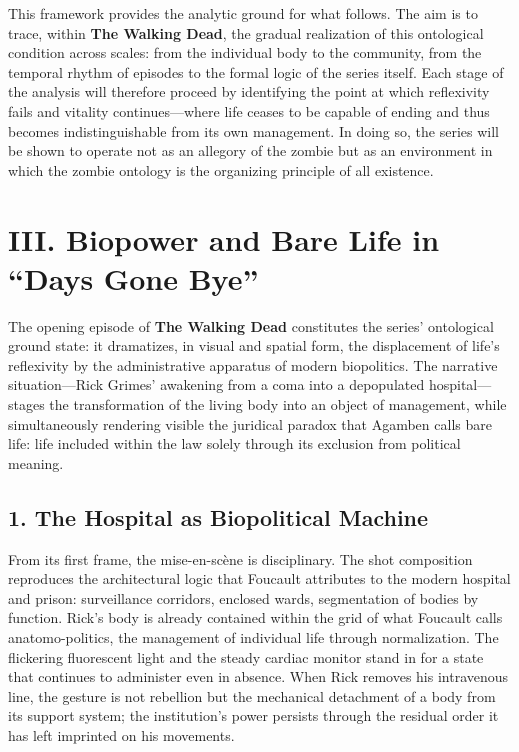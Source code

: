 \documentclass[11pt]{article}
\begin{document}
This framework provides the analytic ground for what follows.  The aim is to trace, within \textbf{The Walking Dead}, the gradual realization of this ontological condition across scales: from the individual body to the community, from the temporal rhythm of episodes to the formal logic of the series itself.  Each stage of the analysis will therefore proceed by identifying the point at which reflexivity fails and vitality continues—where life ceases to be capable of ending and thus becomes indistinguishable from its own management.  In doing so, the series will be shown to operate not as an allegory of the zombie but as an environment in which the zombie ontology is the organizing principle of all existence.
\section*{III. Biopower and Bare Life in “Days Gone Bye”}
\label{sec:org641e5a5}

The opening episode of \textbf{The Walking Dead} constitutes the series’ ontological ground state: it dramatizes, in visual and spatial form, the displacement of life’s reflexivity by the administrative apparatus of modern biopolitics.  The narrative situation—Rick Grimes’ awakening from a coma into a depopulated hospital—stages the transformation of the living body into an object of management, while simultaneously rendering visible the juridical paradox that Agamben calls bare life: life included within the law solely through its exclusion from political meaning.  
\subsection*{1. The Hospital as Biopolitical Machine}
\label{sec:orga8f5c43}

From its first frame, the mise-en-scène is disciplinary.  The shot composition reproduces the architectural logic that Foucault attributes to the modern hospital and prison: surveillance corridors, enclosed wards, segmentation of bodies by function.  Rick’s body is already contained within the grid of what Foucault calls anatomo-politics, the management of individual life through normalization.  The flickering fluorescent light and the steady cardiac monitor stand in for a state that continues to administer even in absence.  When Rick removes his intravenous line, the gesture is not rebellion but the mechanical detachment of a body from its support system; the institution’s power persists through the residual order it has left imprinted on his movements.  
\end{document}
